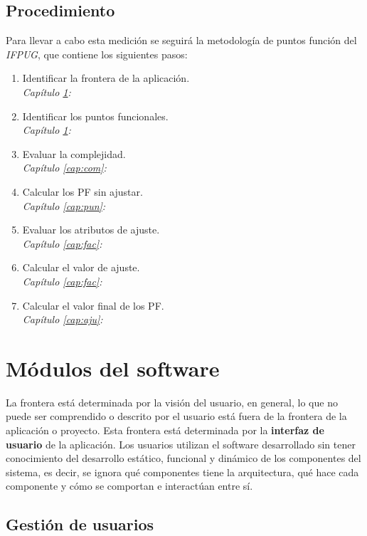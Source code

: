 \documentclass[11pt,a4paper,spanish,twoside]{book}
\begin{document}
\section*{Procedimiento}
Para llevar a cabo esta medición se seguirá la metodología de puntos función
del \emph{IFPUG}, que contiene los siguientes pasos:
\begin{enumerate}
\item Identificar la frontera de la aplicación. \\
  \emph{Capítulo \ref{cap:mod}: }
\item Identificar los puntos funcionales. \\
  \emph{Capítulo \ref{cap:mod}: }
\item Evaluar la complejidad. \\
  \emph{Capítulo \ref{cap:com}: }
\item Calcular los PF sin ajustar. \\
  \emph{Capítulo \ref{cap:pun}: } 
\item Evaluar los atributos de ajuste. \\ 
  \emph{Capítulo \ref{cap:fac}: } 
\item Calcular el valor de ajuste. \\
  \emph{Capítulo \ref{cap:fac}: } 
\item Calcular el valor final de los PF. \\
  \emph{Capítulo \ref{cap:aju}: }
\end{enumerate}

\chapter{Módulos del software} \label{cap:mod}
La frontera está determinada por la visión del usuario, en general, lo que no
puede ser comprendido o descrito por el usuario está fuera de la frontera de la
aplicación o proyecto. Esta frontera está determinada por la \textbf{interfaz de
usuario} de la aplicación. Los usuarios utilizan el software desarrollado sin
tener conocimiento del desarrollo estático, funcional y dinámico de los
componentes del sistema, es decir, se ignora qué componentes tiene la
arquitectura, qué hace cada componente y cómo se comportan e interactúan entre
sí. 

\section{Gestión de usuarios}
\end{document}
